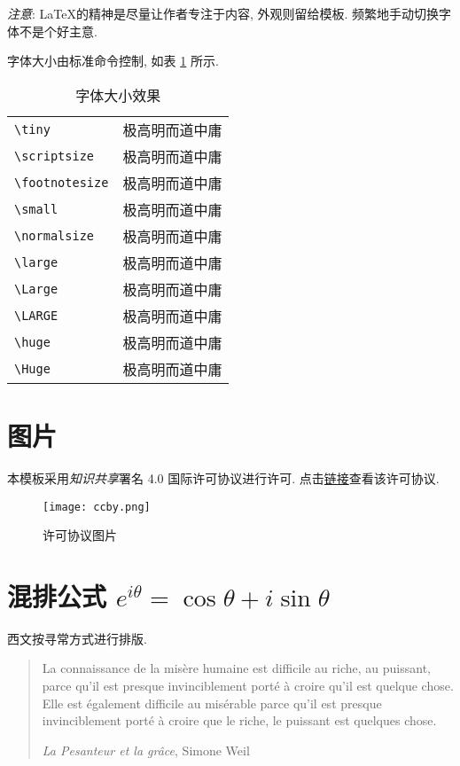 	\emph{注意}: \LaTeX 的精神是尽量让作者专注于内容, 外观则留给模板. 频繁地手动切换字体不是个好主意.
	
	字体大小由标准命令控制, 如表 \ref{table:ziti-size} 所示.

	\begin{table}[h!]
		\begin{tabular}{ll}
			\texttt{\textbackslash tiny} & {\tiny 极高明而道中庸} \\
			\texttt{\textbackslash scriptsize} & {\scriptsize 极高明而道中庸} \\
			\texttt{\textbackslash footnotesize} & {\footnotesize 极高明而道中庸} \\
			\texttt{\textbackslash small} & {\small 极高明而道中庸} \\
			\texttt{\textbackslash normalsize} & {\normalsize 极高明而道中庸} \\
			\texttt{\textbackslash large} & {\large 极高明而道中庸} \\
			\texttt{\textbackslash Large} & {\Large 极高明而道中庸} \\
			\texttt{\textbackslash LARGE} & {\LARGE 极高明而道中庸} \\
			\texttt{\textbackslash huge} & {\huge 极高明而道中庸} \\
			\texttt{\textbackslash Huge} & {\Huge 极高明而道中庸}
		\end{tabular}
		\caption{字体大小效果} \label{table:ziti-size}
	\end{table}

	\section{图片}
	
	本模板采用\emph{知识共享}署名 4.0 国际许可协议进行许可. 点击\href{http://creativecommons.org/licenses/by/4.0/}{链接}查看该许可协议.
	\begin{figure}[h!]\begin{center}
		\texttt{[image: ccby.png]}
		\caption{许可协议图片}
	\end{center}\end{figure}

	\section{混排公式 \texorpdfstring{$e^{i\theta} = \cos\theta + i\sin\theta$}{exp itheta = cos theta + isin theta}}
	西文按寻常方式进行排版.
	\begin{quote}
		La connaissance de la misère humaine est difficile au riche, au puissant, parce qu'il est presque invinciblement porté à croire qu'il est quelque chose. Elle est également difficile au misérable parce qu'il est presque invinciblement porté à croire que le riche, le puissant est quelques chose.

		\begin{flushright}\textit{La Pesanteur et la grâce}, Simone Weil\end{flushright}
	\end{quote}

